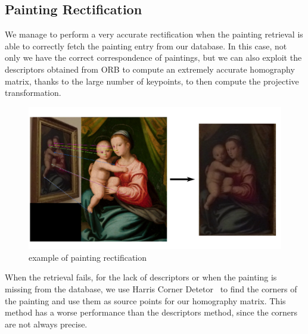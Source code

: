 \subsection{Painting Rectification}
We manage to perform a very accurate rectification when the painting retrieval is able to correctly fetch the painting entry from our database. In this case, not only we have the correct correspondence of paintings, but we can also exploit the descriptors obtained from ORB to compute an extremely accurate homography matrix, thanks to the large number of keypoints, to then compute the projective transformation.

\begin{figure}[h!]
    \centering
    \includegraphics[width=.49\textwidth]{pictures/painting_rectification/rectification.png}
    \caption{example of painting rectification}
    \label{fig:rectification_ex}
\end{figure}

When the retrieval fails, for the lack of descriptors or when the painting is missing from the database, we use Harris Corner Detetor~\cite{harris-corner} to find the corners of the painting and use them as source points for our homography matrix. This method has a worse performance than the descriptors method, since the corners are not always precise.
